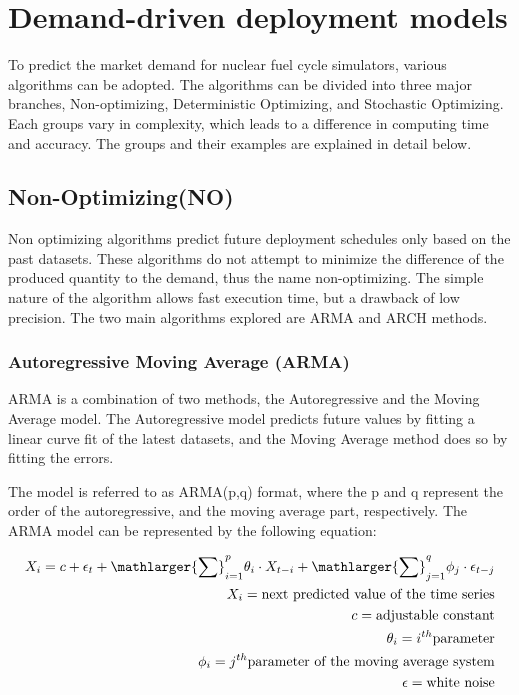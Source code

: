 \section{ Demand-driven deployment models}
To predict the market demand for nuclear fuel cycle simulators, various algorithms
can be adopted. The algorithms can be divided into three major
branches, Non-optimizing, Deterministic Optimizing, and Stochastic
Optimizing. Each groups vary in complexity, which leads to a difference
in computing time and accuracy. The groups and their examples are 
explained in detail below. 

\subsection{Non-Optimizing(NO)}

Non optimizing algorithms predict future deployment schedules
only based on the past datasets. These algorithms do not attempt
to minimize the difference of the produced quantity to the demand,
thus the name non-optimizing. The simple nature of the algorithm
allows fast execution time, but a drawback of low precision. The
two main algorithms explored are \gls{ARMA}
and \gls{ARCH} methods. 

\subsubsection{Autoregressive Moving Average (ARMA)}

\gls{ARMA} is a combination of two methods, the Autoregressive
and the Moving Average model. The Autoregressive model 
predicts future values by fitting a linear curve fit of the latest
datasets, and the Moving Average method does so by fitting the 
errors. \cite{intro_arma}

The model is referred to as ARMA(p,q) format, where the p and q represent 
the order of the autoregressive, and the moving average part,
respectively. 
The \gls{ARMA} model can be represented by the following equation:

\begin{align} 
	X_i=c + \epsilon_t + {\mathlarger{\sum}}_{i=1}^{p}\theta_i \cdot X_{t-i}+
	 {\mathlarger{\sum}}_{j=1}^{q}\phi_j\cdot\epsilon_{t-j}\\
	X_i= \mbox{next predicted value of the time series}\\
	c= \mbox{adjustable constant}\\
	\theta_i=i^{th} \mbox{parameter}\\
	\phi_i=j^{th} \mbox{parameter of the moving average system}\\
	\epsilon = \mbox{white noise}
\end{align}


